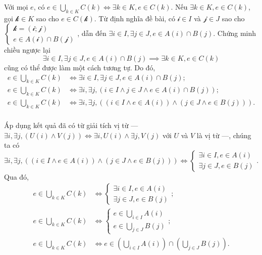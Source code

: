 \solution 

\resetSubexercise Với mọi $e$, có $e \in \bigcup_{k \in K} C(k) \iff \exists k \in K, e \in C(k)$. Nếu $\exists k \in K, e \in C(k)$, gọi $\mathcal{k} \in K$ sao cho $e \in C(\mathcal{k})$. Từ định nghĩa đề bài, có $\mathcal{i} \in I$ và $\mathcal{j} \in J$ sao cho $\begin{cases}
   \mathcal{k} = \left(\mathcal{i}; \mathcal{j}\right) \\
   e \in A(\mathcal{i}) \cap B(\mathcal{j})
\end{cases}$, dẫn đến $\exists i \in I, \exists j \in J, e \in A(i) \cap B(j)$. Chứng minh chiều ngược lại $$\exists i \in I, \exists j \in J, e \in A(i) \cap B(j) \implies \exists k \in K, e \in C(k)$$ cũng có thể được làm một cách tương tự. Do đó,
\begin{align*}
   e \in \bigcup_{k \in K} C(k) &\iff \exists i \in I, \exists j \in J, e \in A(i) \cap B(j); \\
   e \in \bigcup_{k \in K} C(k) &\iff \exists i, \exists j, \left(i \in I \land j \in J \land e \in A(i) \cap B(j)\right); \\
   e \in \bigcup_{k \in K} C(k) &\iff \exists i, \exists j, \left(\left(i \in I \land e \in A(i)\right) \land \left(j \in J \land e \in B(j)\right)\right). \\
\end{align*}

Áp dụng kết quả đã có từ giải tích vị từ --- $\exists i, \exists j, (U(i) \land V(j)) \iff \exists i, U(i) \land \exists j, V(j)$ với $U$ và $V$ là vị từ ---, chúng ta có \begin{equation*}
   \exists i, \exists j, \left(\left(i \in I \land e \in A(i)\right) \land \left(j \in J \land e \in B(j)\right)\right) \iff \begin{cases}
      \exists i \in I, e \in A(i) \\
      \exists j \in J, e \in B(j)
   \end{cases}.
\end{equation*}
Qua đó, 
\begin{align*}
   e \in \bigcup_{k \in K} C(k) &\iff \begin{cases}
      \exists i \in I, e \in A(i) \\
      \exists j \in J, e \in B(j)
   \end{cases}; \\
   e \in \bigcup_{k \in K} C(k) &\iff \begin{cases}
      e \in \bigcup_{i \in I}A(i) \\
      e \in \bigcup_{j \in J}B(j)
   \end{cases}; \\
   e \in \bigcup_{k \in K} C(k) &\iff e \in \left(\bigcup_{i \in I}A(i)\right) \cap \left(\bigcup_{j \in J}B(j)\right).
\end{align*}

